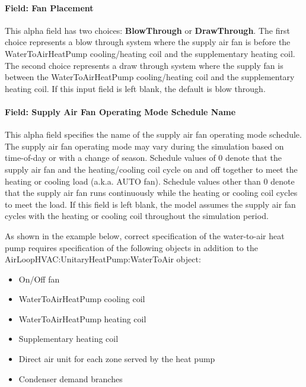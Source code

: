 \paragraph{Field: Fan Placement}\label{field-fan-placement-6}

This alpha field has two choices: \textbf{BlowThrough} or \textbf{DrawThrough}. The first choice represents a blow through system where the supply air fan is before the WaterToAirHeatPump cooling/heating coil and the supplementary heating coil. The second choice represents a draw through system where the supply fan is between the WaterToAirHeatPump cooling/heating coil and the supplementary heating coil. If this input field is left blank, the default is blow through.

\paragraph{Field: Supply Air Fan Operating Mode Schedule Name}\label{field-supply-air-fan-operating-mode-schedule-name-2}

This alpha field specifies the name of the supply air fan operating mode schedule. The supply air fan operating mode may vary during the simulation based on time-of-day or with a change of season. Schedule values of 0 denote that the supply air fan and the heating/cooling coil cycle on and off together to meet the heating or cooling load (a.k.a. AUTO fan). Schedule values other than 0 denote that the supply air fan runs continuously while the heating or cooling coil cycles to meet the load. If this field is left blank, the model assumes the supply air fan cycles with the heating or cooling coil throughout the simulation period.

As shown in the example below, correct specification of the water-to-air heat pump requires specification of the following objects in addition to the AirLoopHVAC:UnitaryHeatPump:WaterToAir object:

\begin{itemize}
\item
  On/Off fan
\item
  WaterToAirHeatPump cooling coil
\item
  WaterToAirHeatPump heating coil
\item
  Supplementary heating coil
\item
  Direct air unit for each zone served by the heat pump
\item
  Condenser demand branches
\end{itemize}

